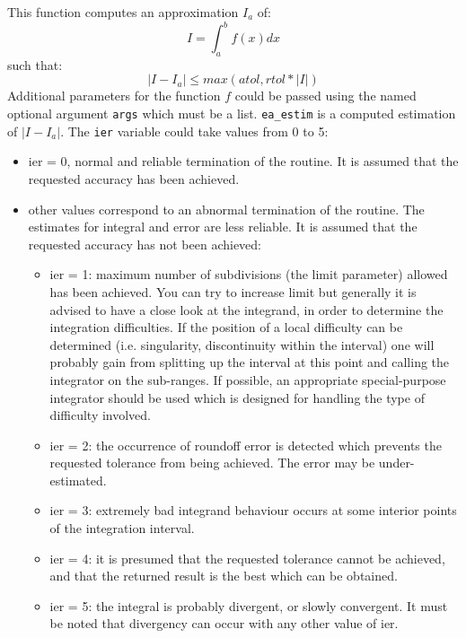 \begin{mandescription}
This function computes an approximation $I_a$ of:
$$
   I = \int_a^b f(x) dx
$$
such that:
$$
   | I - I_a | \le  max(atol, rtol*|I|)
$$
Additional parameters for the function $f$ could be passed using the
named optional argument \verb+args+ which must be a
list. \verb+ea_estim+ is a computed estimation of $| I - I_a |$. The
\verb+ier+ variable could take values from 0 to 5: 
\begin{itemize}
\item ier = 0,  normal and reliable termination of the routine. It is assumed that the
      requested  accuracy has been achieved.
\item other values correspond to an abnormal termination of the routine. The estimates
      for integral and error are less reliable. It is assumed that the  requested accuracy
      has not been achieved:
      \begin{itemize}
      \item ier = 1: maximum number of subdivisions (the limit
            parameter) allowed has been achieved. You can try to
            increase limit but generally it is advised to have a close look at the
            integrand, in order to determine the integration
            difficulties. If the position of a local difficulty can
            be determined (i.e.  singularity, discontinuity within
            the interval) one will probably gain from  splitting up
            the interval at this point and calling the integrator
            on the sub-ranges. If possible, an appropriate
            special-purpose integrator should be used which is
            designed for handling the type  of difficulty involved.
      \item ier = 2: the occurrence of roundoff error is detected
            which prevents the requested tolerance from being
            achieved. The error may be under-estimated.
      \item ier = 3: extremely bad integrand behaviour occurs at 
            some interior points of the integration interval.
      \item ier = 4: it is presumed that the requested tolerance 
            cannot be achieved, and that the returned result is the
            best which can be obtained.
      \item ier = 5: the integral is probably divergent, or slowly
            convergent. It must be noted that divergency can occur with
            any other value of ier.
      \end{itemize}
\end{itemize}

\end{mandescription}

